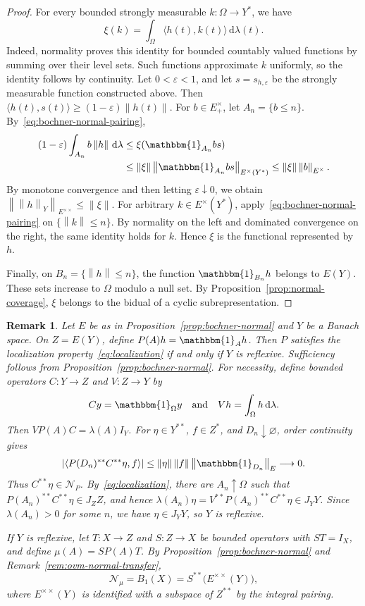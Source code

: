 \documentclass[11pt,leqno]{amsart}
\theoremstyle{compact}
\numberwithin{equation}{section}
\theoremstyle{compactremark}
\newtheorem{remark}[theorem]{Remark}
\theoremstyle{compact}
\newcommand{\1}{\mathbbm{1}}
\newcommand{\rmd}{\mathrm{d}}
\newcommand{\norm}[1]{\left\|#1\right\|}
\newcommand{\abs}[1]{\left|#1\right|}
\newcommand{\inp}[2]{\langle #1,#2\rangle}
\begin{document}
\begin{proof}
For every bounded strongly measurable $k:\Omega\to Y^*$, we have
\begin{equation}\label{eq:bochner-normal-pairing}
\xi(k)=\int_\Omega\inp{h(t)}{k(t)}\,\rmd\lambda(t).
\end{equation}
Indeed, normality proves this identity for bounded countably valued functions by summing over their level sets. Such functions approximate $k$ uniformly, so the identity follows by continuity. Let $0<\varepsilon<1$, and let $s=s_{h,\varepsilon}$ be the strongly measurable function constructed above. Then $\inp{h(t)}{s(t)}\geq(1-\varepsilon)\norm{h(t)}$. For $b\in E^\times_+$, let $A_n=\{b\leq n\}$. By~\eqref{eq:bochner-normal-pairing},
\begin{align*}
(1-\varepsilon)\int_{A_n}b\norm{h}\,\rmd\lambda
&\leq \xi(\1_{A_n}bs)\\
&\leq\norm{\xi}\norm{\1_{A_n}bs}_{E^\times(Y^*)}
 \leq\norm{\xi}\norm{b}_{E^\times}.
\end{align*}
By monotone convergence and then letting $\varepsilon\downarrow0$, we obtain $\norm{\norm{h}_Y}_{E^{\times\times}}\leq\norm{\xi}$. For arbitrary $k\in E^\times(Y^*)$, apply~\eqref{eq:bochner-normal-pairing} on $\{\norm{k}\leq n\}$. By normality on the left and dominated convergence on the right, the same identity holds for $k$. Hence $\xi$ is the functional represented by $h$.

Finally, on $B_n=\{\norm{h}\leq n\}$, the function $\1_{B_n}h$ belongs to $E(Y)$. These sets increase to $\Omega$ modulo a null set. By Proposition~\ref{prop:normal-coverage}, $\xi$ belongs to the bidual of a cyclic subrepresentation.
\end{proof}

\begin{remark}\label{rem:bochner-localization-dilation}
Let $E$ be as in Proposition~\ref{prop:bochner-normal} and $Y$ be a Banach space. On $Z=E(Y)$, define $P(A)h=\1_Ah$. Then $P$ satisfies the localization property~\eqref{eq:localization} if and only if $Y$ is reflexive. Sufficiency follows from Proposition~\ref{prop:bochner-normal}. For necessity, define bounded operators $C\colon Y\to Z$ and $V\colon Z\to Y$ by
\[
Cy=\1_\Omega y\quad\text{and}\quad Vh=\int_\Omega h\,\rmd\lambda.
\]
Then $VP(A)C=\lambda(A)I_Y$. For $\eta\in Y^{**}$, $f\in Z^*$, and $D_n\downarrow\varnothing$, order continuity gives
\[
\abs{\inp{P(D_n)^{**}C^{**}\eta}{f}}\leq\norm{\eta}\norm{f}\norm{\1_{D_n}}_E\longrightarrow0.
\]
Thus $C^{**}\eta\in\mathcal N_P$. By~\eqref{eq:localization}, there are $A_n\uparrow\Omega$ such that $P(A_n)^{**}C^{**}\eta\in J_ZZ$, and hence $ \lambda(A_n)\eta=V^{**}P(A_n)^{**}C^{**}\eta\in J_YY $. Since $\lambda(A_n)>0$ for some $n$, we have $\eta\in J_YY$, so $Y$ is reflexive.

If $Y$ is reflexive, let $T\colon X\to Z$ and $S\colon Z\to X$ be bounded operators with $ST=I_X$, and define $\mu(A)=SP(A)T$. By Proposition~\ref{prop:bochner-normal} and Remark~\ref{rem:ovm-normal-transfer},
\[
\mathcal N_\mu=B_1(X)=S^{**}\bigl(E^{\times\times}(Y)\bigr),
\]
where $E^{\times\times}(Y)$ is identified with a subspace of $Z^{**}$ by the integral pairing.
\end{remark}
\endgroup
\end{document}
